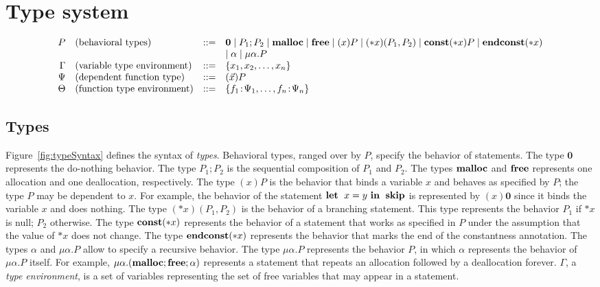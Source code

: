 \section{Type system}
\label{sec:typesystem}

\begin{figure*}
\[
\begin{array}{rlcl}
  P & (\mbox{behavioral types})&::=& \mathbf{0} \mid P_{1};P_{2} \mid \mathbf{malloc} \mid \mathbf{free} \mid (x)P \mid (*x)(P_1,P_2) \mid \mathbf{const}(*x) P  \mid \mathbf{endconst}(*x)\\
  &  &  & \mid \alpha \mid \mu\alpha.P\\
  \Gamma & (\mbox{variable type environment}) &::=& \{x_1, x_2, \dots, x_n\}\\
  \Psi & (\mbox{dependent function type}) &::=& (\vec{x})P\\
  \Theta & (\mbox{function type environment}) &::=& \{f_1\!:\! \Psi_1,\dots,f_n\!:\! \Psi_n\}\\
\end{array}
\]
\caption{Syntax of types.} 
\label{fig:typeSyntax}
\end{figure*}

\subsection{Types}

Figure~\ref{fig:typeSyntax} defines the syntax of \emph{types}.
Behavioral types, ranged over by \(P\), specify the behavior of
statements.  The type $\mathbf{0}$ represents the do-nothing behavior.
The type $P_1;P_2$ is the sequential composition of $P_1$ and $P_2$.
The types $\mathbf{malloc}$ and $\mathbf{free}$ represents one allocation and one
deallocation, respectively.  The type $(x)P$ is the behavior that
binds a variable $x$ and behaves as specified by $P$; the type $P$ may
be dependent to $x$.  For example, the behavior of the statement
$\mathbf{let}\;\ x = y\ \mathbf{in}\;\ \mathbf{skip}$ is represented by $(x)\mathbf{0}$ since it
binds the variable $x$ and does nothing. The type $(*x)(P_1,P_2)$ is
the behavior of a branching statement.  This type represents the
behavior $P_1$ if $*x$ is null; $P_2$ otherwise.  The type
$\mathbf{const}(*x)$ represents the behavior of a statement that works as
specified in $P$ under the assumption that the value of $*x$ does not
change.  The type $\mathbf{endconst}(*x)$ represents the behavior that marks the
end of the constantness annotation.  The types $\alpha$ and
$\mu\alpha.P$ allow to specify a recursive behavior.  The type
$\mu\alpha.P$ represents the behavior $P$, in which $\alpha$
represents the behavior of $\mu\alpha.P$ itself.  For example,
$\mu\alpha.(\mathbf{malloc};\mathbf{free};\alpha)$ represents a statement that repeats
an allocation followed by a deallocation forever.  $\Gamma$, a
\emph{type environment}, is a set of variables representing the set of
free variables that may appear in a statement.

